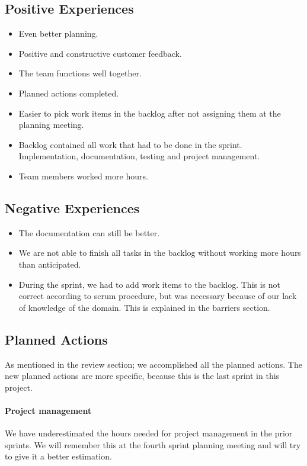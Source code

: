\subsection{Positive Experiences}
\begin{itemize}
	\item Even better planning.
	\item Positive and constructive customer feedback.
	\item The team functions well together.
	\item Planned actions completed.
	\item Easier to pick work items in the backlog after not assigning them at the planning meeting.
	\item Backlog contained all work that had to be done in the sprint. Implementation, documentation, testing and project management.
	\item Team members worked more hours. 
\end{itemize}

\subsection{Negative Experiences}
\begin{itemize}
	\item The documentation can still be better.
	\item We are not able to finish all tasks in the backlog without working more hours than anticipated.
	\item During the sprint, we had to add work items to the backlog. This is not correct according to \Gls{scrum} procedure, but was necessary because of our lack of knowledge of the domain. This is explained in the barriers section.  
\end{itemize}

\subsection{Planned Actions}
As mentioned in the review section; we accomplished all the planned actions. The new planned actions are more specific, because this is the last sprint in this project.

\paragraph{Project management}
We have underestimated the hours needed for project management in the prior sprints. We will remember this at the fourth sprint planning meeting and will try to give it a better estimation.
